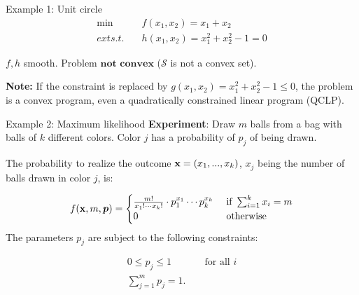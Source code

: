 \documentclass[11pt,compress,t,notes=noshow, xcolor=table]{beamer}
\begin{document}
\begin{frame2}{Example 1: Unit circle}
$$
\begin{aligned}
\min \quad & f(x_1, x_2) = x_1 + x_2 \\
ext{s.t. } \quad & h(x_1,x_2) = x_1^2 + x_2^2 - 1 = 0
\end{aligned}
$$

\vfill


$f, h$ smooth. Problem $\textbf{not convex}$ ($\mathcal{S}$ is not a convex set).

\spacer

\begin{footnotesize}
\textbf{Note: } If the constraint is replaced by $g(x_1, x_2) = x_1^2 + x_2^2 - 1 \le 0$, the problem is a convex program, even a quadratically constrained linear program (QCLP).
\end{footnotesize}

\end{frame2}

\begin{frame2}{Example 2: Maximum likelihood}
\textbf{Experiment}: Draw $m$ balls from a bag with balls of $k$ different colors.
Color $j$ has a probability of $p_j$ of being drawn.

\spacer

The probability to realize the outcome $\mathbf{x} = (x_1, ..., x_k)$, $x_j$ being the number of balls drawn in color $j$, is:

$$
f(\mathbf{x}, m, \bm{p}) = \begin{cases} \frac{m!}{x_1! \cdots x_k!} \cdot p_1^{x_1} \cdots p_k^{x_k} & \text{ if } \sum_{i = 1}^k x_i = m \\ 0 & \text{ otherwise}\end{cases}
$$
The parameters $p_j$ are subject to the following constraints:

$$
\begin{aligned}
0 \le p_j \le 1 && \text{ for all } i \\
\sum_{j = 1}^m p_j = 1. &&
\end{aligned}
$$
\end{frame2}
\end{document}
